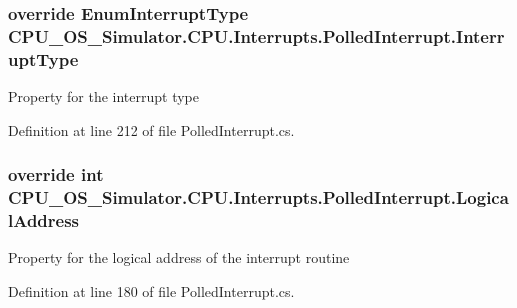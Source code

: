 \subsubsection[{Interrupt\+Type}]{\setlength{\rightskip}{0pt plus 5cm}override {\bf Enum\+Interrupt\+Type} C\+P\+U\+\_\+\+O\+S\+\_\+\+Simulator.\+C\+P\+U.\+Interrupts.\+Polled\+Interrupt.\+Interrupt\+Type\hspace{0.3cm}{\ttfamily [get]}}\label{class_c_p_u___o_s___simulator_1_1_c_p_u_1_1_interrupts_1_1_polled_interrupt_a8e4b6a4a0f81b0480895ca7e0aa82e42}


Property for the interrupt type 



Definition at line 212 of file Polled\+Interrupt.\+cs.

\hypertarget{class_c_p_u___o_s___simulator_1_1_c_p_u_1_1_interrupts_1_1_polled_interrupt_af3f35e5d2e388f4dce7929b1d2847c38}{}
\subsubsection[{Logical\+Address}]{\setlength{\rightskip}{0pt plus 5cm}override int C\+P\+U\+\_\+\+O\+S\+\_\+\+Simulator.\+C\+P\+U.\+Interrupts.\+Polled\+Interrupt.\+Logical\+Address\hspace{0.3cm}{\ttfamily [get]}}\label{class_c_p_u___o_s___simulator_1_1_c_p_u_1_1_interrupts_1_1_polled_interrupt_af3f35e5d2e388f4dce7929b1d2847c38}


Property for the logical address of the interrupt routine 



Definition at line 180 of file Polled\+Interrupt.\+cs.

\hypertarget{class_c_p_u___o_s___simulator_1_1_c_p_u_1_1_interrupts_1_1_polled_interrupt_a62e236aa64f6ade8cb01192768bb75ba}{}
